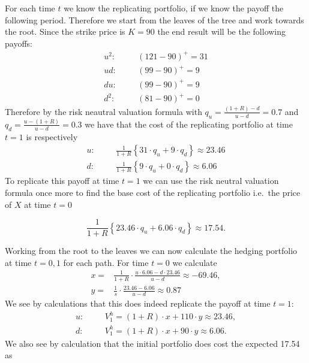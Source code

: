 \documentclass[
]{book}
\begin{document}
For each time \(t\) we know the replicating portfolio, if we know the payoff the following period. Therefore we start from the leaves of the tree and work towards the root. Since the strike price is \(K=90\) the end result will be the following payoffs:
\begin{align*}
u^2:\hspace{20pt}&(121-90)^+=31\\
ud:\hspace{20pt}&(99-90)^+=9\\
du:\hspace{20pt}&(99-90)^+=9\\
d^2:\hspace{20pt}&(81-90)^+=0
\end{align*}
Therefore by the risk neautral valuation formula with \(q_u=\frac{(1+R)-d}{u-d}=0.7\) and \(q_d=\frac{u-(1+R)}{u-d}=0.3\) we have that the cost of the replicating portfolio at time \(t=1\) is respectively
\begin{align*}
u:\hspace{20pt}&\frac{1}{1+R}\left\{31\cdot q_u + 9 \cdot q_d\right\}\approx 23.46\\
d:\hspace{20pt}&\frac{1}{1+R}\left\{9\cdot q_u + 0 \cdot q_d\right\}\approx 6.06
\end{align*}
To replicate this payoff at time \(t=1\) we can use the risk neutral valuation formula once more to find the base cost of the replicating portfolio i.e.~the price of \(X\) at time \(t=0\)

\[
\frac{1}{1+R}\left\{23.46\cdot q_u + 6.06 \cdot q_d\right\}\approx 17.54.
\]

Working from the root to the leaves we can now calculate the hedging portfolio at time \(t=0,1\) for each path. For time \(t=0\) we calculate
\begin{align*}
x=&\frac{1}{1+R}\cdot \frac{u\cdot 6.06-d\cdot 23.46}{u-d}\approx -69.46,\\
y=&\frac{1}{s}\cdot\frac{23.46-6.06}{u-d}\approx0.87
\end{align*}
We see by calculations that this does indeed replicate the payoff at time \(t=1\):
\begin{align*}
u:\hspace{20pt}&V_1^h=(1+R)\cdot x + 110\cdot y\approx 23.46,\\
d:\hspace{20pt}&V_1^h=(1+R)\cdot x + 90\cdot y\approx 6.06.
\end{align*}
We also see by calculation that the initial portfolio does cost the expected 17.54 as
\end{document}
